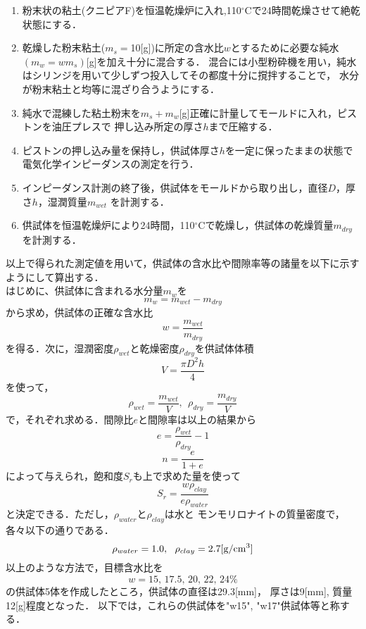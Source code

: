 \begin{enumerate}
\item
	粉末状の粘土(クニピアF)を恒温乾燥炉に入れ,110$^\circ$Cで24時間乾燥させて絶乾状態にする．
\item
	乾燥した粉末粘土($m_s=$10[g])に所定の含水比$w$とするために必要な純水$(m_w=w m_s)$[g]を加え十分に混合する．
	混合には小型粉砕機を用い，純水はシリンジを用いて少しずつ投入してその都度十分に撹拌することで，
	水分が粉末粘土と均等に混ざり合うようにする．
\item
	純水で混練した粘土粉末を$m_s+m_w$[g]正確に計量してモールドに入れ，ピストンを油圧プレスで
	押し込み所定の厚さ$h$まで圧縮する．
\item
	ピストンの押し込み量を保持し，供試体厚さ$h$を一定に保ったままの状態で電気化学インピーダンスの測定を行う．
\item
	インピーダンス計測の終了後，供試体をモールドから取り出し，直径$D$，厚さ$h$，湿潤質量$m_{wet}$
	を計測する．
\item
	供試体を恒温乾燥炉により24時間，110$^\circ$Cで乾燥し，供試体の乾燥質量$m_{dry}$を計測する．
\end{enumerate}
以上で得られた測定値を用いて，供試体の含水比や間隙率等の諸量を以下に示すようにして算出する．\\

はじめに、供試体に含まれる水分量$m_w$を
\begin{equation}
	m_w=m_{wet}-m_{dry}
	\label{eqn:}
\end{equation}
から求め，供試体の正確な含水比
\begin{equation}
	w=\frac{m_{wet}}{m_{dry}}
	\label{eqn:water_content}
\end{equation}
を得る．次に，湿潤密度$\rho_{wet}$と乾燥密度$\rho_{dry}$を供試体体積
\begin{equation}
	V=\frac{\pi D^2h}{4}
	\label{eqn:}
\end{equation}
を使って，
\begin{equation}
	\rho_{wet}=\frac{m_{wet}}{V}, \ \ 
	\rho_{dry}=\frac{m_{dry}}{V}
	\label{eqn:}
\end{equation}
で，それぞれ求める．間隙比$e$と間隙率は以上の結果から
\begin{equation}
	e=\frac{\rho_{wet}}{\rho_{dry}} -1
	\label{eqn:}
\end{equation}
\begin{equation}
	n=\frac{e}{1+e}
	\label{eqn:}
\end{equation}
によって与えられ，飽和度$S_r$も上で求めた量を使って
\begin{equation}
	S_r=\frac{w\rho_{clay}}{e\rho_{water}}
	\label{eqn:}
\end{equation}
と決定できる．ただし，$\rho_{water}$と$\rho_{clay}$は水と
モンモリロナイトの質量密度で，各々以下の通りである．
\begin{equation}
	\rho_{water}=1.0, \ \ \rho_{clay}=2.7 {\rm [g/cm^3]}
	\label{eqn:}
\end{equation}
以上のような方法で，目標含水比を
\[
	w=15,\, 17.5,\, 20,\, 22,\, 24\%
\]
の供試体5体を作成したところ，供試体の直径は29.3[mm]，
厚さは9[mm], 質量12[g]程度となった．
以下では，これらの供試体を"w15", "w17"供試体等と称する．
